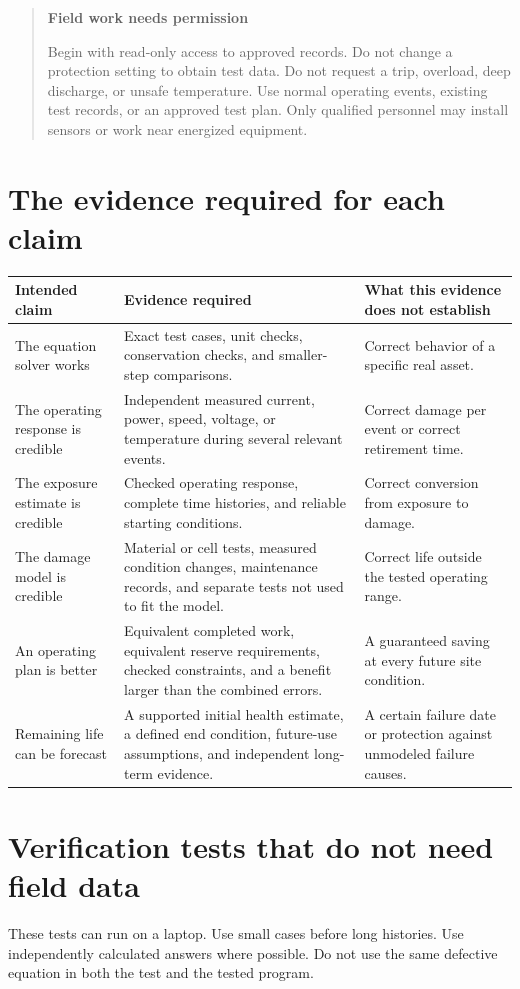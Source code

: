 \documentclass[11pt,a4paper]{report}
\newenvironment{warningbox}[1]{\begin{quote}\color{reportamber}\textbf{#1}\par\normalcolor}{\end{quote}}
\begin{document}
\begin{warningbox}{Field work needs permission}
Begin with read-only access to approved records.
Do not change a protection setting to obtain test data.
Do not request a trip, overload, deep discharge, or unsafe temperature.
Use normal operating events, existing test records, or an approved test plan.
Only qualified personnel may install sensors or work near energized equipment.
\end{warningbox}

\section{The evidence required for each claim}
\begin{longtable}{L{0.19\textwidth}L{0.34\textwidth}L{0.35\textwidth}}
\toprule Intended claim & Evidence required & What this evidence does not establish \\ \midrule\endhead
The equation solver works & Exact test cases, unit checks, conservation checks, and smaller-step comparisons. & Correct behavior of a specific real asset. \\
The operating response is credible & Independent measured current, power, speed, voltage, or temperature during several relevant events. & Correct damage per event or correct retirement time. \\
The exposure estimate is credible & Checked operating response, complete time histories, and reliable starting conditions. & Correct conversion from exposure to damage. \\
The damage model is credible & Material or cell tests, measured condition changes, maintenance records, and separate tests not used to fit the model. & Correct life outside the tested operating range. \\
An operating plan is better & Equivalent completed work, equivalent reserve requirements, checked constraints, and a benefit larger than the combined errors. & A guaranteed saving at every future site condition. \\
Remaining life can be forecast & A supported initial health estimate, a defined end condition, future-use assumptions, and independent long-term evidence. & A certain failure date or protection against unmodeled failure causes. \\
\bottomrule
\end{longtable}

\section{Verification tests that do not need field data}
These tests can run on a laptop.
Use small cases before long histories.
Use independently calculated answers where possible.
Do not use the same defective equation in both the test and the tested program.
\end{document}
